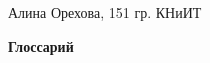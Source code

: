 \documentclass[14pt]{extarticle}
\begin{document}
\begin{flushright}
    Алина Орехова, 151 гр. КНиИТ
\end{flushright}
\begin{center}
    \Large\textbf{Глоссарий}
\end{center}


\end{document}
